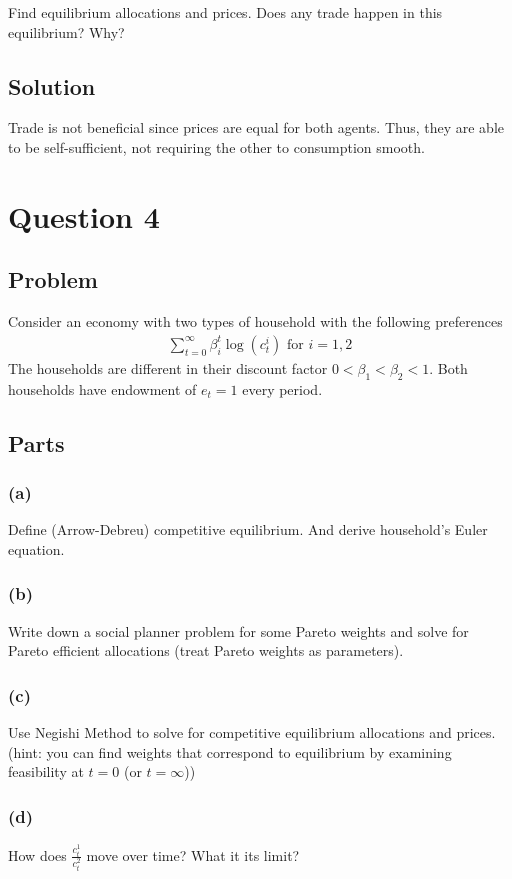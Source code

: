 \documentclass[10pt, a4paper]{article}
\begin{document}
    Find equilibrium allocations and prices. Does any trade happen in this equilibrium? Why?
  \subsection*{Solution}
    Trade is not beneficial since prices are equal for both agents. Thus, they are able to be self-sufficient, not requiring the other to consumption smooth.
\section*{Question 4}
  \subsection*{Problem}
    Consider an economy with two types of household with the following preferences
    \begin{gather*}
      \sum_{t=0}^{\infty} \beta_i^t \log(c^i_t) \text{ for } i = 1,2
    \end{gather*}
    The households are different in their discount factor $0 < \beta_1 < \beta_2 < 1$. Both households have endowment of $e_t = 1$ every period.
  \subsection*{Parts}
    \subsubsection*{(a)}
      Define (Arrow-Debreu) competitive equilibrium. And derive household's Euler equation.
    \subsubsection*{(b)}
      Write down a social planner problem for some Pareto weights and solve for Pareto efficient allocations (treat Pareto weights as parameters).
    \subsubsection*{(c)}
      Use Negishi Method to solve for competitive equilibrium allocations and prices. (hint: you can find weights that correspond to equilibrium by examining feasibility at $t = 0$ (or $t = \infty$))
    \subsubsection*{(d)}
      How does $\frac{c^1_t}{c^2_t}$ move over time? What it its limit?
\end{document}
